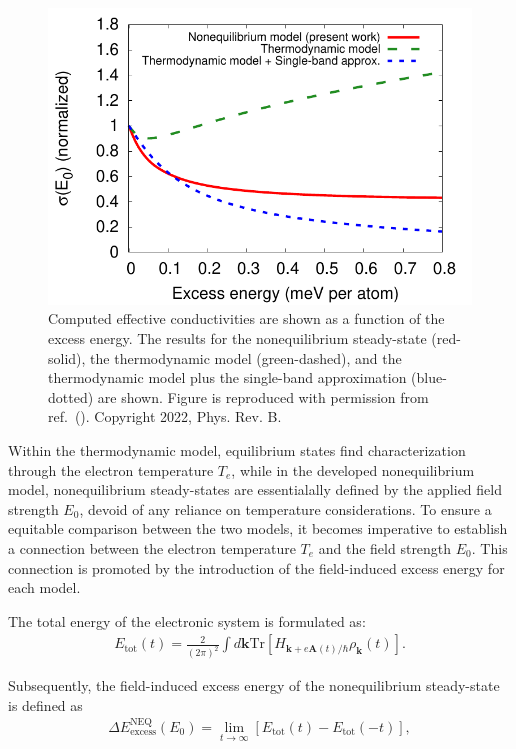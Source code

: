\begin{figure}[htbp]
	\centering
	\includegraphics[width=0.8\linewidth]{pic/sigma_thermo.pdf}
	\caption{\label{fig:compare} Computed effective conductivities are shown as a function of the excess energy. The results for the nonequilibrium steady-state (red-solid), the thermodynamic model (green-dashed), and the thermodynamic model plus the single-band approximation (blue-dotted) are shown. Figure is reproduced with permission from ref.~(\cite{PhysRevB.106.024313}). Copyright 2022, Phys. Rev. B.}
\end{figure}

Within the thermodynamic model, equilibrium states find characterization through the electron
temperature $T_e$, while in the developed nonequilibrium model, nonequilibrium steady-states are
essentialally defined by the applied field strength $E_0$, devoid of any reliance on temperature
considerations. To ensure a equitable comparison between the two models, it becomes imperative to
establish a connection between the electron temperature $T_e$ and the field strength $E_0$. This connection is promoted by the introduction of the field-induced excess energy for each model.

The total energy of the electronic system is formulated as:
\begin{eqnarray}
	E_{\mathrm{tot}}(t)=\frac{2}{(2\pi)^2} \int d\mathbf k \mathrm{Tr}\left[H_{\mathbf k+ e\mathbf A(t)/\hbar} \rho_{\mathbf k}(t)\right].
	\label{eqn:totalenergy}
\end{eqnarray}

Subsequently, the field-induced excess energy of the nonequilibrium steady-state is defined as
\begin{eqnarray}
	\Delta E^\mathrm{NEQ}_{\mathrm{excess}}(E_0)=\lim_{t\rightarrow \infty} \left [E_{\mathrm{tot}}(t)
	-E_{\mathrm{tot}}(-t) \right ],
	\label{eq:excess-energy-neq}
\end{eqnarray}

